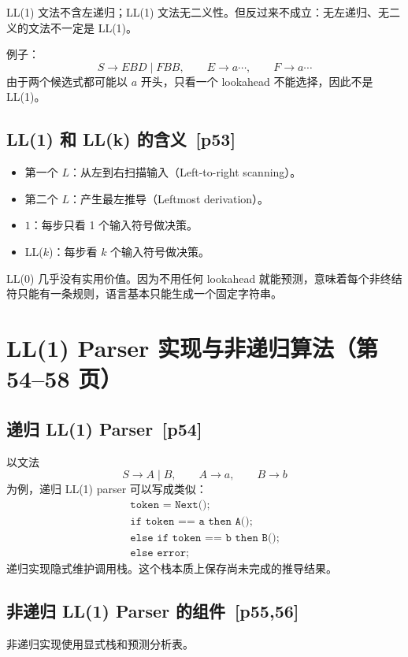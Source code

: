 \documentclass[UTF8,fontset=none,11pt]{ctexart}
\newenvironment{warnbox}[1][]{%
  \par\medskip\noindent{\color{warnrule}\rule{\linewidth}{1.1pt}}\par\nopagebreak
  \noindent{\bfseries\color{warnrule}#1}\par\nopagebreak\smallskip}%
  {\par\nopagebreak\smallskip\noindent{\color{warnrule}\rule{\linewidth}{0.4pt}}\par\medskip}
\newcommand{\pg}[1]{\texorpdfstring{{\small\color{graytext}\,[p#1]}}{ [p#1]}}
\begin{document}
\begin{warnbox}[LL(1) 的重要性质]
LL(1) 文法不含左递归；LL(1) 文法无二义性。但反过来不成立：无左递归、无二义的文法不一定是 LL(1)。
\end{warnbox}

例子：
\[
S\to EBD\mid FBB,\qquad E\to a\cdots,\qquad F\to a\cdots
\]
由于两个候选式都可能以 \(a\) 开头，只看一个 lookahead 不能选择，因此不是 LL(1)。

\subsection{LL(1) 和 LL(k) 的含义 \pg{53}}
\begin{itemize}
  \item 第一个 \(L\)：从左到右扫描输入（Left-to-right scanning）。
  \item 第二个 \(L\)：产生最左推导（Leftmost derivation）。
  \item \(1\)：每步只看 1 个输入符号做决策。
  \item LL(\(k\))：每步看 \(k\) 个输入符号做决策。
\end{itemize}

LL(0) 几乎没有实用价值。因为不用任何 lookahead 就能预测，意味着每个非终结符只能有一条规则，语言基本只能生成一个固定字符串。

\section{LL(1) Parser 实现与非递归算法（第 54--58 页）}

\subsection{递归 LL(1) Parser \pg{54}}
以文法
\[
S\to A\mid B,\qquad A\to a,\qquad B\to b
\]
为例，递归 LL(1) parser 可以写成类似：
\[
\begin{array}{l}
\texttt{token = Next();}\\
\texttt{if token == a then A();}\\
\texttt{else if token == b then B();}\\
\texttt{else error;}
\end{array}
\]
递归实现隐式维护调用栈。这个栈本质上保存尚未完成的推导结果。

\subsection{非递归 LL(1) Parser 的组件 \pg{55,56}}
非递归实现使用显式栈和预测分析表。
\end{document}
